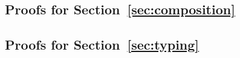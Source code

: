 \documentclass[a4paper, UKenglish, cleveref, autoref, thm-restate]{lipics-v2021}
\newenvironment{LibCode*}{%
  \begin{tcolorbox}[%
    colframe=white,%
    boxrule=0.0pt,%
    top=2.5pt,%
    left=2.5pt,%
    bottom=2.5pt,%
    right=2.5pt,%
    boxsep=0pt%
  ]\vspace{-0.2\baselineskip}%
}{%
  \vspace{-1\baselineskip}%
  \end{tcolorbox}%
}
\newcommand*\LibCode[1]{\begin{LibCode*}{#1}\end{LibCode*}}
\newcommand*\AppCode[1]{{#1}}
\begin{document}

  \subsection{Proofs for Section~\ref{sec:composition}}
  \LibCode\KCKitAp
  \LibCode\KCKitApProof

  \LibCode\KDistLiftCompose
  \LibCode\KDistLiftComposeProof

  \LibCode\KCommLiftWeaken
  \LibCode\KCommLiftWeakenProof

  \LibCode\KCommLiftWeakenTraverse
  \LibCode\KCommLiftWeakenTraverseProof

  \LibCode\KWeakenCancelsSingle
  \LibCode\KWeakenCancelsSingleProof

  \LibCode\KWeakenCancelsSingleTraverse
  \LibCode\KWeakenCancelsSingleTraverseProof

  \LibCode\KDistLiftSingle
  \LibCode\KDistLiftSingleProof

  \LibCode\KDistLiftSingleTraverse
  \LibCode\KDistLiftSingleTraverseProof




  \subsection{Proofs for Section~\ref{sec:typing}}
  \LibCode\KLiftTyping
  \LibCode\KLiftTypingProof

  \LibCode\KSingleTyping
  \LibCode\KSingleTypingProof










\end{document}
